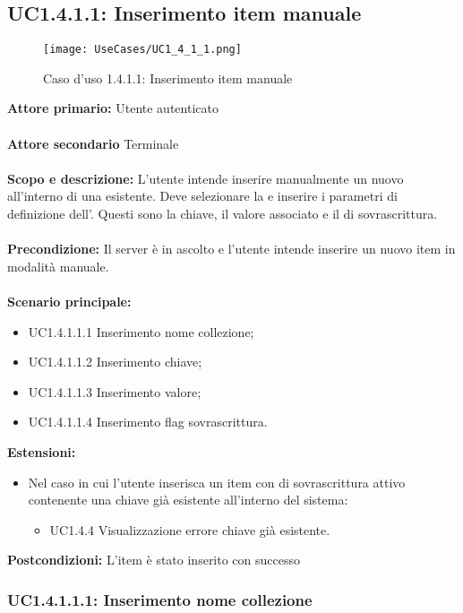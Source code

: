 \documentclass{scalatekids-article}
\begin{document}
\subsection{UC1.4.1.1: Inserimento item manuale}
\begin{figure}[H]
  \begin{center}
    \texttt{[image: UseCases/UC1\_4\_1\_1.png]}
    \caption*{Caso d'uso 1.4.1.1: Inserimento item manuale}
  \end{center}
\end{figure}
\textbf{Attore primario:} Utente autenticato\\ \\
\textbf{Attore secondario} Terminale\\ \\
\textbf{Scopo e descrizione:} L'utente intende inserire manualmente un nuovo  all'interno di una  esistente. Deve selezionare la  e inserire i parametri di definizione dell'. Questi sono la chiave, il valore associato e il  di sovrascrittura.\\ \\
\textbf{Precondizione:} Il server è in ascolto e l'utente intende inserire un nuovo item in modalità manuale.\\ \\
\textbf{Scenario principale:}
\begin{itemize}
  \item UC1.4.1.1.1 Inserimento nome collezione;
  \item UC1.4.1.1.2 Inserimento chiave;
  \item UC1.4.1.1.3 Inserimento valore;
  \item UC1.4.1.1.4 Inserimento flag sovrascrittura.
\end{itemize}
\textbf{Estensioni:}
\begin{itemize}
  \item Nel caso in cui l'utente inserisca un item con  di sovrascrittura attivo contenente una chiave già esistente all'interno del sistema:
  \begin{itemize}
  \item UC1.4.4 Visualizzazione errore chiave già esistente.
  \end{itemize}
\end{itemize}
\textbf{Postcondizioni:} L'item è stato inserito con successo

\subsubsection{UC1.4.1.1.1: Inserimento nome collezione}
\end{document}
